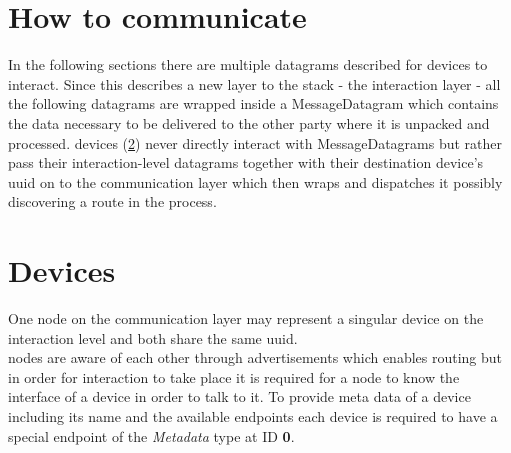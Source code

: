 \documentclass[a4paper]{report}
\begin{document}
        \section{How to communicate}
            In the following sections there are multiple datagrams described for \glspl{device} to interact. Since this describes a new layer to the stack - the interaction layer - all the following \glspl{datagram} are wrapped inside a MessageDatagram which contains the data necessary to be delivered to the other party where it is unpacked and processed. \Glspl{device} (\ref{section:interaction:device}) never directly interact with MessageDatagrams but rather pass their interaction-level datagrams together with their destination \gls{device}'s \acrshort{uuid} on to the communication layer which then wraps and dispatches it possibly discovering a route in the process.
            
        \section{Devices}\label{section:interaction:device}
            One \gls{node} on the communication layer may represent a singular \gls{device} on the interaction level and both share the same \acrshort{uuid}.\\
            \Glspl{node} are aware of each other through advertisements which enables routing but in order for interaction to take place it is required for a \gls{node} to know the interface of a \gls{device} in order to talk to it. To provide meta data of a \gls{device} including its name and the available endpoints each \gls{device} is required to have a special endpoint of the \emph{Metadata} type at ID \textbf{0}.
            
\end{document}
